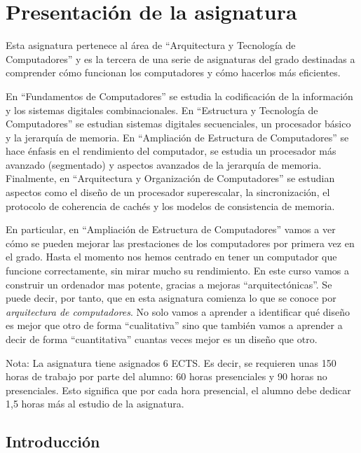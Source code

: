 \documentclass[12pt,onecolumn]{memoir}
\begin{document}
\setcounter{chapter}{-1}

\def\figurename{Figura}
\def\tablename{Tabla}
\def\chaptername{Tema}

\chapter{Presentación de la asignatura}
\label{cap:presentacion}

Esta asignatura pertenece al área de ``Arquitectura y Tecnología de
Computadores'' y es la tercera de una serie de asignaturas del grado
destinadas a comprender cómo funcionan los computadores y cómo
hacerlos más eficientes.

En ``Fundamentos de Computadores'' se estudia la codificación de la
información y los sistemas digitales combinacionales. En ``Estructura
y Tecnología de Computadores'' se estudian sistemas digitales
secuenciales, un procesador básico y la jerarquía de memoria. En
``Ampliación de Estructura de Computadores'' se hace énfasis en el
rendimiento del computador, se estudia un procesador más avanzado
(segmentado) y aspectos avanzados de la jerarquía de
memoria. Finalmente, en ``Arquitectura y Organización de
Computadores'' se estudian aspectos como el diseño de un procesador
superescalar, la sincronización, el protocolo de coherencia de cachés
y los modelos de consistencia de memoria.

En particular, en ``Ampliación de Estructura de Computadores'' vamos a
ver cómo se pueden mejorar las prestaciones de los computadores por
primera vez en el grado. Hasta el momento nos hemos centrado en tener
un computador que funcione correctamente, sin mirar mucho su
rendimiento. En este curso vamos a construir un ordenador mas potente,
gracias a mejoras ``arquitectónicas''. Se puede decir, por tanto, que
en esta asignatura comienza lo que se conoce por \emph{arquitectura de
  computadores}. No solo vamos a aprender a identificar qué diseño es
mejor que otro de forma ``cualitativa'' sino que también vamos a
aprender a decir de forma ``cuantitativa'' cuantas veces mejor es un
diseño que otro.

Nota: La asignatura tiene asignados 6 ECTS. Es decir, se requieren
unas 150 horas de trabajo por parte del alumno: 60 horas presenciales
y 90 horas no presenciales. Esto significa que por cada hora
presencial, el alumno debe dedicar 1,5 horas más al estudio de la
asignatura.

\section{Introducción}
\label{sec:introduccion_presentacion}
\end{document}
